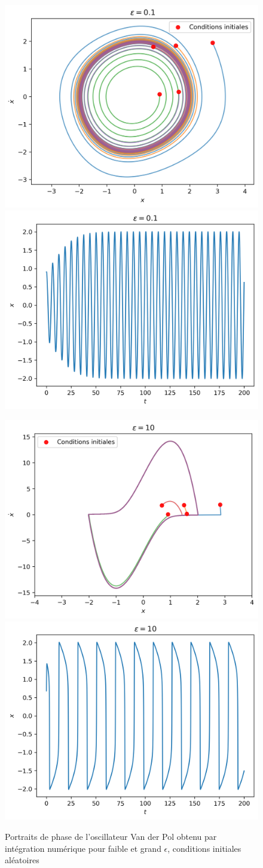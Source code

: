 %
\begin{figure}[t]
    \centering
    \begin{subcaptionblock}{0.9\linewidth}
        \includegraphics[width=.45\linewidth]{images/vdp/vanderpol_small.png}%
        \hfill
        \includegraphics[width=.45\linewidth]{images/vdp/vanderpol_small_x.png}%
    \end{subcaptionblock}
    \centering
    \begin{subcaptionblock}{0.9\linewidth}
        \includegraphics[width=.45\linewidth]{images/vdp/vanderpol_large.png}%
        \hfill
        \includegraphics[width=.45\linewidth]{images/vdp/vanderpol_large_x.png}%
    \end{subcaptionblock}
    \label{fig:portrait_vdp}
    \caption{Portraits de phase de l'oscillateur Van der Pol obtenu par intégration numérique pour faible et grand $\epsilon$, conditions initiales aléatoires}
\end{figure}
